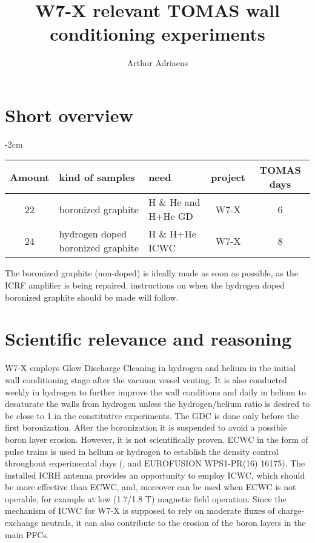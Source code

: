 \documentclass{article}
\title{W7-X relevant TOMAS wall conditioning experiments}
\author{Arthur Adriaens}
\begin{document}
\maketitle

\section{Short overview}
\begin{center}
    \addtolength{\leftskip} {-2cm} %
    \addtolength{\rightskip}{-2cm}
    \begin{tabular}{||c p{4cm} p{4cm} c c||}
         \hline
         Amount & kind of samples & need & project & TOMAS days \\ [0.5ex]
         \hline\hline
         22 & boronized graphite & H \& He and H+He GD & W7-X & 6 \\
         24 & hydrogen doped boronized graphite & H \& H+He ICWC & W7-X & 8 \\
         \hline
    \end{tabular}
\end{center}
The boronized graphite (non-doped) is ideally made as soon as possible, as the
ICRF amplifier is being repaired, instructions on when the hydrogen doped
boronized graphite should be made will follow.
\section{Scientific relevance and reasoning}
W7-X  employs Glow Discharge Cleaning in hydrogen and helium in the initial
wall conditioning  stage after the vacuum vessel venting. It is also conducted
weekly in hydrogen to further improve the wall conditions and daily in helium
to desaturate the walls from hydrogen\cite{AndreiNucMatEn} unless the
hydrogen/helium ratio is desired to be close to 1 in the constitutive
experiments. The GDC is done only before the first boronization. After
the boronization it is suspended to avoid a possible boron layer erosion.
However, it is not scientifically proven. ECWC in the form of pulse trains is
used in helium or hydrogen to establish the density control throughout
experimental days (\cite{Goriaev_2020},\cite{WAUTERS2018235} and
EUROFUSION WPS1-PR(16) 16175). The installed ICRH antenna provides an opportunity to
employ ICWC, which should be more effective than ECWC, and, moreover can be used when
ECWC is not operable, for example at low (1.7/1.8 T) magnetic field operation.
Since the mechanism of ICWC for W7-X is supposed to rely on moderate fluxes of
charge-exchange neutrals, it can also contribute to the erosion of the boron
layers in the main PFCs.
\end{document}
